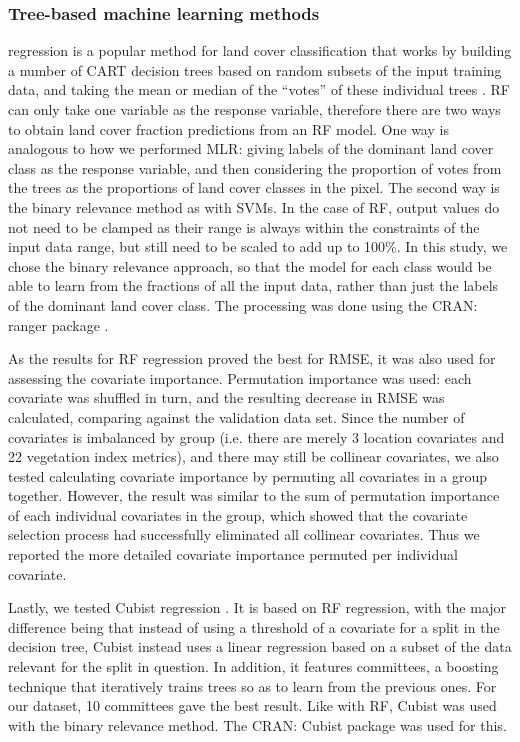 \documentclass[review,authoryear,3p]{elsarticle}
\newcommand{\cran}[1]{CRAN: #1}
\begin{document}
\subsubsection{Tree-based machine learning methods}

 regression is a popular method for land cover classification that works by building a number of \gls{CART} decision trees based on random subsets of the input training data, and taking the mean or median of the ``votes'' of these individual trees \citep{breiman2001random}.
\ac{RF} can only take one variable as the response variable, therefore there are two ways to obtain land cover fraction predictions from an \ac{RF} model.
One way is analogous to how we performed \ac{MLR}: giving labels of the dominant land cover class as the response variable, and then considering the proportion of votes from the trees as the proportions of land cover classes in the pixel.
The second way is the binary relevance method as with \glspl{SVM}.
In the case of \gls{RF}, output values do not need to be clamped as their range is always within the constraints of the input data range, but still need to be scaled to add up to 100\%.
In this study, we chose the binary relevance approach, so that the model for each class would be able to learn from the fractions of all the input data, rather than just the labels of the dominant land cover class.
The processing was done using the \cran{ranger} package \citep{ranger}.

As the results for \gls{RF} regression proved the best for \gls{RMSE}, it was also used for assessing the covariate importance.
Permutation importance was used: each covariate was shuffled in turn, and the resulting decrease in \gls{RMSE} was calculated, comparing against the validation data set.
Since the number of covariates is imbalanced by group (i.e. there are merely 3 location covariates and 22 vegetation index metrics), and there may still be collinear covariates, we also tested calculating covariate importance by permuting all covariates in a group together.
However, the result was similar to the sum of permutation importance of each individual covariates in the group, which showed that the covariate selection process had successfully eliminated all collinear covariates.
Thus we reported the more detailed covariate importance permuted per individual covariate.

Lastly, we tested Cubist regression \citep{cubist}.
It is based on \gls{RF} regression, with the major difference being that instead of using a threshold of a covariate for a split in the decision tree, Cubist instead uses a linear regression based on a subset of the data relevant for the split in question.
In addition, it features committees, a boosting technique that iteratively trains trees so as to learn from the previous ones.
For our dataset, 10 committees gave the best result.
Like with \gls{RF}, Cubist was used with the binary relevance method.
The \cran{Cubist} package \citep{cubistpackage} was used for this.
\end{document}
